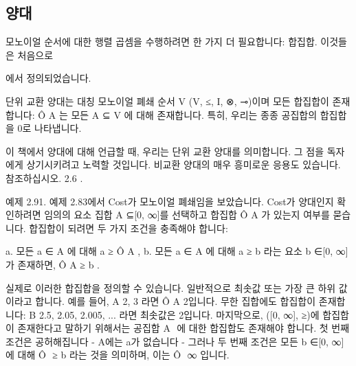 \documentclass[11pt, a4paper, twoside, openany]{book}
\begin{document}
{\subsection{양대}
\label{sec:2-5-2}

모노이얼 순서에 대한 행렬 곱셈을 수행하려면 한 가지 더 필요합니다: 합집합. 이것들은 처음으로 
\begin{definitionbox}[정의 1.81]
\hspace{0pt}에서 정의되었습니다.
\end{definitionbox}

\par\medskip
\begin{definitionbox}[정의 2.90.]
단위 교환 양대는 대칭 모노이얼 폐쇄 순서 V (V, ≤, I, ⊗, ⊸)이며 모든 합집합이 존재합니다:  Ô A 는 모든 A ⊆ V 에 대해 존재합니다. 특히, 우리는 종종 공집합의 합집합을 0\hspace{0pt}로 나타냅니다.
\end{definitionbox}

\par\medskip
이 책에서 양대에 대해 언급할 때, 우리는 단위 교환 양대를 의미합니다. 그 점을 독자에게 상기시키려고 노력할 것입니다. 비교환 양대의 매우 흥미로운 응용도 있습니다. 참조하십시오. 2.6 .

\par\medskip
예제 2.91. 예제 2.83\hspace{0pt}에서 Cost\hspace{0pt}가 모노이얼 폐쇄임을 보았습니다. Cost\hspace{0pt}가 양대인지 확인하려면 임의의 요소 집합 A ⊆[0, ∞]를 선택하고 합집합 Ô A 가 있는지 여부를 묻습니다. 합집합이 되려면 두 가지 조건을 충족해야 합니다:

\par\medskip
a. 모든 a ∈ A 에 대해 a ≥ Ô A ,
b. 모든 a ∈ A 에 대해 a ≥ b 라는 요소 b ∈[0, ∞]가 존재하면, Ô A ≥ b .

\par\medskip
실제로 이러한 합집합을 정의할 수 있습니다. 일반적으로 최솟값 또는 가장 큰 하위 값이라고 합니다. 예를 들어, A  {2, 3} 라면 Ô A  2\hspace{0pt}입니다. 무한 집합에도 합집합이 존재합니다: B  {2.5, 2.05, 2.005, ...} 라면 최솟값은 2\hspace{0pt}입니다. 마지막으로, ([0, ∞], ≥)에 합집합이 존재한다고 말하기 위해서는 공집합 A   에 대한 합집합도 존재해야 합니다. 첫 번째 조건은 공허해집니다 - A\hspace{0pt}에는 a\hspace{0pt}가 없습니다 - 그러나 두 번째 조건은 모든 b ∈[0, ∞]에 대해 Ô  ≥ b 라는 것을 의미하며, 이는 Ô   ∞ 입니다.

}
\end{document}
